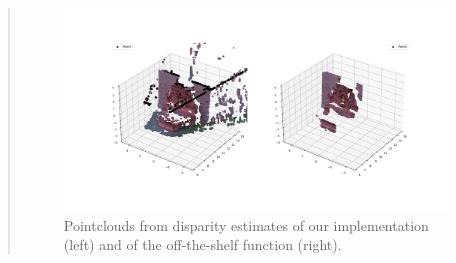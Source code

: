 \documentclass[11pt]{article}
\begin{document}
\begin{quote}
\begin{figure}[h]
    \centering
    \includegraphics[width=1.0\linewidth]{figs/disparity_to_pointcloud.png}
    \caption{Pointclouds from disparity estimates of our implementation (left) and of the off-the-shelf function (right).}
    \label{fig:disparity2pcd}
\end{figure}

\end{quote}





\end{document}
